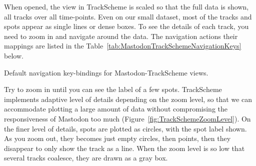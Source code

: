 When opened, the view in TrackScheme is scaled so that the full data is shown, all tracks over all time-points. 
Even on our small dataset, most of the tracks and spots appear as single lines or dense boxes.
To see the details of each track, you need to zoom in and navigate around the data.
The navigation actions their mappings are listed in the Table~\ref{tab:MastodonTrackSchemeNavigationKeys} below.

\begin{table}[!htbp]
    \centering
    \caption{Default navigation key-bindings for Mastodon-TrackScheme views.}
    
    \label{tab:MastodonTrackSchemeNavigationKeys}
\end{table}

Try to zoom in until you can see the label of a few spots.
TrackScheme implements adaptive level of details depending on the zoom level, so that we can accommodate plotting a large amount of data without compromising the responsiveness of Mastodon too much (Figure~\ref{fig:TrackSchemeZoomLevel}).
On the finer level of details, spots are plotted as circles, with the spot label shown.
As you zoom out, they becomes just empty circles, then points, then they disappear to only show the track as a line.
When the zoom level is so low that several tracks coalesce, they are drawn as a gray box. 

